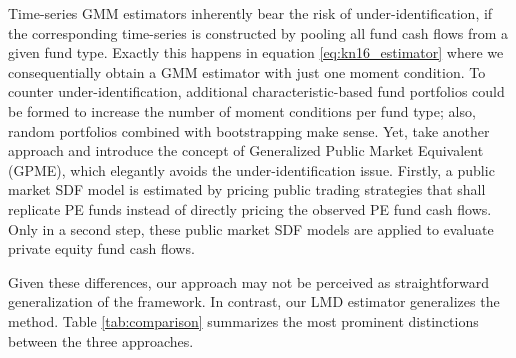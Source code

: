 \documentclass[12pt]{article}
\begin{document}
Time-series GMM estimators inherently bear the risk of under-identification, if the corresponding time-series is constructed by pooling all fund cash flows from a given fund type.
Exactly this happens in equation \ref{eq:kn16_estimator} where we consequentially obtain a GMM estimator with just one moment condition.
To counter under-identification, additional characteristic-based fund portfolios could be formed to increase the number of moment conditions per fund type; also, random portfolios combined with bootstrapping make sense.
Yet, \cite{KN16} take another approach and introduce the concept of Generalized Public Market Equivalent (GPME), which elegantly avoids the under-identification issue.
Firstly, a public market SDF model is estimated by pricing public trading strategies that shall replicate PE funds instead of directly pricing the observed PE fund cash flows.
Only in a second step, these public market SDF models are applied to evaluate private equity fund cash flows.

Given these differences, our approach may not be perceived as straightforward generalization of the \cite{KN16} framework.
In contrast, our LMD estimator generalizes the \cite{DLP12} method. 
Table \ref{tab:comparison} summarizes the most prominent distinctions between the three approaches.

\begin{table}[ht]
	\centering
	\caption{Comparison to similar estimation frameworks.} 
	\label{tab:comparison}
\end{table}
\end{document}
